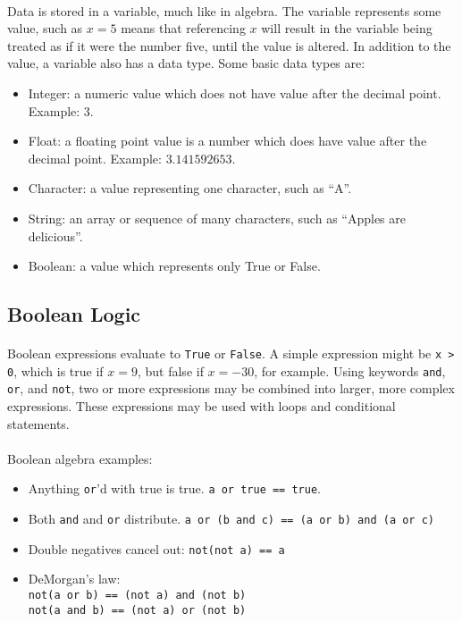 \documentclass[letter,10pt]{article}
\begin{document}
\paragraph{}Data is stored in a variable, much like in algebra. The variable represents some value, such as $x = 5$ means that referencing $x$ will result in the variable being treated as if it were the number five, until the value is altered. In addition to the value, a variable also has a data type. Some basic data types are:

\begin{itemize}
    \item Integer: a numeric value which does not have value after the decimal point. Example: $3$.
    \item Float: a floating point value is a number which does have value after the decimal point. Example: $3.141592653$.
    \item Character: a value representing one character, such as ``A''.
    \item String: an array or sequence of many characters, such as ``Apples are delicious''.
    \item Boolean: a value which represents only True or False.
\end{itemize}

\subsection{Boolean Logic}
\paragraph{}Boolean expressions evaluate to \verb|True| or \verb|False|. A simple expression might be \verb|x > 0|, which is true if $x = 9$, but false if $x = -30$, for example. Using keywords \verb|and|, \verb|or|, and \verb|not|, two or more expressions may be combined into larger, more complex expressions. These expressions may be used with loops and conditional statements.

\paragraph{}Boolean algebra examples:
\begin{itemize}
    \item Anything \verb|or|'d with true is true. \verb|a or true == true|.
    \item Both \verb|and| and \verb|or| distribute. \verb|a or (b and c) == (a or b) and (a or c)|
    \item Double negatives cancel out: \verb|not(not a) == a|
    \item DeMorgan's law: \\
        \verb|not(a or b) == (not a) and (not b)| \\
        \verb|not(a and b) == (not a) or (not b)|
\end{itemize}
\end{document}

